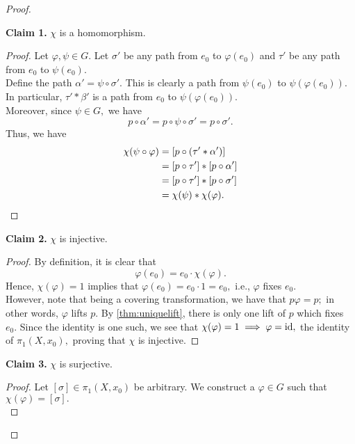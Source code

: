 \documentclass[12pt]{article}
\newenvironment{blockquote}
{\begin{mdframed}[skipabove=0pt, skipbelow=0pt, innertopmargin=4pt, innerbottommargin=4pt, bottomline=false,topline=false,rightline=false, linewidth=2pt]}
{\end{mdframed}}
\begin{document}
\begin{proof}
	\begin{blockquote}
		\textbf{Claim 1.} $\chi$ is a homomorphism.
		\begin{proof} 
			Let $\varphi, \psi \in G.$ Let $\sigma'$ be any path from $e_0$ to $\varphi(e_0)$ and $\tau'$ be any path from $e_0$ to $\psi(e_0).$\\
			Define the path $\alpha' = \psi\circ\sigma'.$ This is clearly a path from $\psi(e_0)$ to $\psi(\varphi(e_0)).$ In particular, $\tau'*\beta'$ is a path from $e_0$ to $\psi(\varphi(e_0)).$ \\
			Moreover, since $\psi \in G,$ we have
			\begin{equation*} 
				p\circ\alpha' = p\circ\psi\circ\sigma' = p\circ\sigma'.
			\end{equation*}
			Thus, we have
			\begin{align*} 
				\chi(\psi\circ\varphi) &= [p\circ(\tau'*\alpha')]\\
				&=[p\circ\tau']*[p\circ\alpha']\\
				&=[p\circ\tau']*[p\circ\sigma']\\
				&=\chi(\psi)*\chi(\varphi). \qedhere
			\end{align*}
		\end{proof}
	\end{blockquote}
	\phantom{hi}
	\begin{blockquote}
		\textbf{Claim 2.} $\chi$ is injective.
		\begin{proof} 
			By definition, it is clear that 
			\begin{equation*} 
				\varphi(e_0) = e_0\cdot\chi(\varphi).
			\end{equation*}
			Hence, $\chi(\varphi) = 1$ implies that $\varphi(e_0) = e_0\cdot1 = e_0,$ i.e., $\varphi$ fixes $e_0.$\\
			However, note that being a covering transformation, we have that $p\varphi = p;$ in other words, $\varphi$ lifts $p.$ By \cref{thm:uniquelift}, there is only one lift of $p$ which fixes $e_0.$ Since the identity is one such, we see that $\chi(\varphi) = 1 \implies \varphi = \operatorname{id},$ the identity of $\pi_1(X, x_0),$ proving that $\chi$ is injective. 
		\end{proof}
	\end{blockquote}
	\phantom{hi}
	\begin{blockquote}
		\textbf{Claim 3.} $\chi$ is surjective.
		\begin{proof} 
			Let $[\sigma]\in\pi_1(X, x_0)$ be arbitrary. We construct a $\varphi \in G$ such that $\chi(\varphi) = [\sigma].$\\

\end{proof}
\end{blockquote}
\end{proof}
\end{document}
